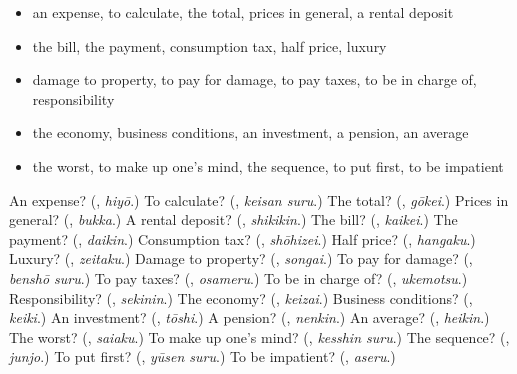 \begin{itemize}
\raggedright
  \item an expense, to calculate, the total, prices in general, a rental deposit
  \item the bill, the payment, consumption tax, half price, luxury
  \item damage to property, to pay for damage, to pay taxes, to be in charge of, responsibility
  \item the economy, business conditions, an investment, a pension, an average
  \item the worst, to make up one's mind, the sequence, to put first, to be impatient
\end{itemize}

\begin{tcolorbox}[breakable,colback=teal!4,colframe=teal!35!black,title={Before you move on}]
An expense? (\textbf{}, \emph{hiyō}.) To calculate? (\textbf{}, \emph{keisan suru}.) The total? (\textbf{}, \emph{gōkei}.) Prices in general? (\textbf{}, \emph{bukka}.) A rental deposit? (\textbf{}, \emph{shikikin}.) The bill? (\textbf{}, \emph{kaikei}.) The payment? (\textbf{}, \emph{daikin}.) Consumption tax? (\textbf{}, \emph{shōhizei}.) Half price? (\textbf{}, \emph{hangaku}.) Luxury? (\textbf{}, \emph{zeitaku}.) Damage to property? (\textbf{}, \emph{songai}.) To pay for damage? (\textbf{}, \emph{benshō suru}.) To pay taxes? (\textbf{}, \emph{osameru}.) To be in charge of? (\textbf{}, \emph{ukemotsu}.) Responsibility? (\textbf{}, \emph{sekinin}.) The economy? (\textbf{}, \emph{keizai}.) Business conditions? (\textbf{}, \emph{keiki}.) An investment? (\textbf{}, \emph{tōshi}.) A pension? (\textbf{}, \emph{nenkin}.) An average? (\textbf{}, \emph{heikin}.) The worst? (\textbf{}, \emph{saiaku}.) To make up one's mind? (\textbf{}, \emph{kesshin suru}.) The sequence? (\textbf{}, \emph{junjo}.) To put first? (\textbf{}, \emph{yūsen suru}.) To be impatient? (\textbf{}, \emph{aseru}.)
\end{tcolorbox}
